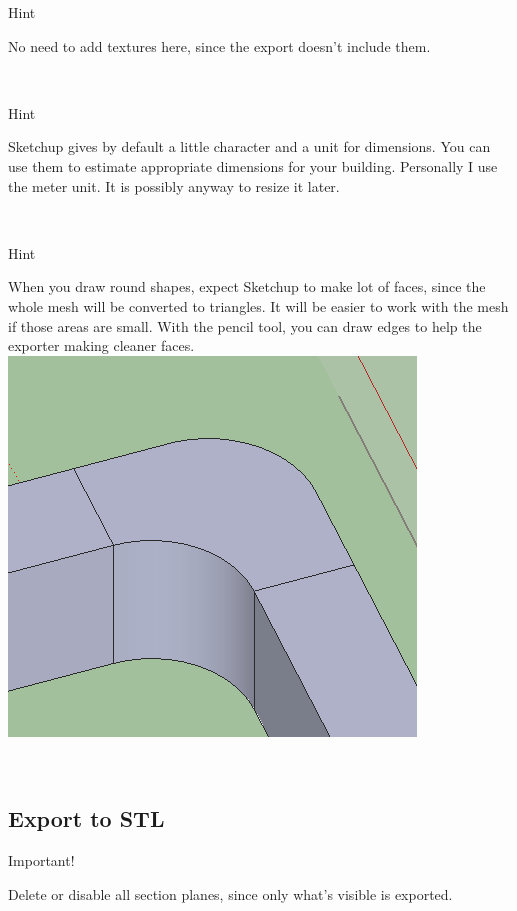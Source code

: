 \documentclass[10pt,a4paper]{article}
\newenvironment{warning}{%
  \begin{bclogo}[logo=\bcattention, couleurBarre=red, noborder=true, 
               couleur=LightSalmon]{Important!}
}{%
  \end{bclogo}\hspace{1px}\\
}
\newenvironment{hint}{%
\begin{bclogo}[logo=\bcinfo, couleurBarre=Green, noborder=true, 
               couleur=white]{Hint}
}{%
\end{bclogo}\hspace{1px}\\
}
\begin{document}
\begin{hint}
No need to add textures here, since the export doesn't include them.
\end{hint}
\begin{hint}
Sketchup gives by default a little character and a unit for dimensions. You can use them to estimate appropriate dimensions for your building. Personally I use the meter unit. It is possibly anyway to resize it later.
\end{hint}
\begin{hint}
When you draw round shapes, expect Sketchup to make lot of faces, since the whole mesh will be converted to triangles. It will be easier to work with the mesh if those areas are small. With the pencil tool, you can draw edges to help the exporter making cleaner faces.\\
\includegraphics[scale=0.5]{map_sketchup_hint_faces.png} 
\end{hint}
\subsection{Export to STL}
\begin{warning}
Delete or disable all section planes, since only what's visible is exported.
\end{warning}
\end{document}
